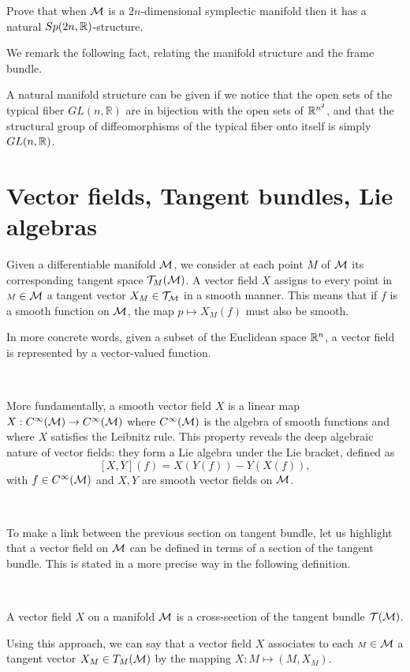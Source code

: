 \begin{ex}
Prove that when $\mathcal{M}$ is a $2n$-dimensional symplectic manifold then it has a natural 
$Sp(2n,\mathbb{R})$-structure.  
\end{ex}

We remark the following fact, relating the manifold structure and the frame bundle. 

A natural manifold structure can be given if we  notice that the open sets of the typical fiber  $GL(n,\mathbb{R})$ are in bijection with the open sets of $\mathbb{R}^{n^{2}}$, and that the structural group of diffeomorphisms  of the typical fiber onto itself is simply $GL(n,\mathbb{R})$.

\section{Vector fields, Tangent bundles, Lie algebras}
Given a differentiable manifold 
$\mathcal{M}$, we consider at each point ${\scriptstyle M}$ of $\mathcal{M}$ its corresponding tangent space $\mathcal{T}_{\scriptstyle M}(\mathcal{M})$. A vector field 
$X$  assigns to every  point in ${\scriptstyle M}\in \mathcal{M}$ a tangent vector $X_{\scriptstyle M}\in \mathcal{T}_{\mathcal{M}}$ in a smooth manner. This means that if $f$ is a smooth function on $
\mathcal{M}$, the map 
$p\mapsto X_{\scriptstyle M}(f)$ must also be smooth.
 
In more concrete words, given a subset of the Euclidean space $\mathbb{R}^n$, a vector field is represented by a vector-valued function. 

\, 

More fundamentally, a smooth vector field $X$ is a linear map  $X:C^{\infty}(\mathcal{M})\to C^{\infty}(\mathcal{M})$ where $C^{\infty}(\mathcal{M})$ is the algebra of smooth functions and where $X$ satisfies the Leibnitz rule. This property reveals the deep algebraic nature of vector fields: they form a Lie algebra under the Lie bracket, defined as
\[[X,Y](f)=X(Y(f))-Y(X(f)),\] with $f\in C^{\infty}(\mathcal{M})$ and $X,Y$ are smooth vector fields on $\mathcal{M}$.

\, 

To make a link between the previous section on tangent bundle, let us highlight that a vector field on $\mathcal{M}$ can be defined in terms of a section of the tangent bundle. This is stated in a more precise way in the following definition.

\, 


\begin{definition}
A vector field $X$ on a manifold $\mathcal{M}$ is a cross-section of the tangent bundle
$\mathcal{T}(\mathcal{M})$.
\end{definition}
Using this approach, we can say that a vector field $X$ associates to each ${\scriptstyle M} \in \mathcal{M}$ a tangent vector $ X_{\scriptstyle M} \in T_{\scriptstyle M}(\mathcal{M})$ by the mapping $X: {\scriptstyle M} \mapsto ({\scriptstyle M}, X_{\scriptstyle M})$.


